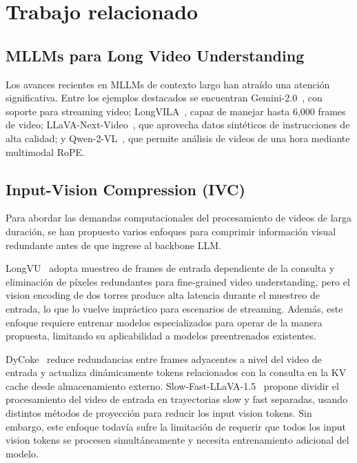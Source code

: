 \section{Trabajo relacionado}\label{sec:related}

\subsection{MLLMs para Long Video Understanding}
Los avances recientes en MLLMs de contexto largo han atraído una atención significativa. Entre los ejemplos destacados se encuentran Gemini-2.0~\cite{google2024cgemini-2.0}, con soporte para streaming video; LongVILA~\cite{Chen2025longvila}, capaz de manejar hasta 6,000 frames de video; LLaVA-Next-Video~\cite{zhang2024llavanext-video}, que aprovecha datos sintéticos de instrucciones de alta calidad; y Qwen-2-VL~\cite{Qwen2VL}, que permite análisis de videos de una hora mediante multimodal RoPE.

\subsection{Input-Vision Compression (IVC)}
Para abordar las demandas computacionales del procesamiento de videos de larga duración, se han propuesto varios enfoques para comprimir información visual redundante antes de que ingrese al backbone LLM. 

LongVU~\cite{shen2024longvu} adopta muestreo de frames de entrada dependiente de la consulta y eliminación de píxeles redundantes para fine-grained video understanding, pero el vision encoding de dos torres produce alta latencia durante el muestreo de entrada, lo que lo vuelve impráctico para escenarios de streaming. Además, este enfoque requiere entrenar modelos especializados para operar de la manera propuesta, limitando su aplicabilidad a modelos preentrenados existentes. 

DyCoke~\cite{tao2024dycokedynamiccompressiontokens} reduce redundancias entre frames adyacentes a nivel del video de entrada y actualiza dinámicamente tokens relacionados con la consulta en la KV cache desde almacenamiento externo. Slow-Fast-LLaVA-1.5~\cite{xu2025slowfastllava15familytokenefficientvideo} propone dividir el procesamiento del video de entrada en trayectorias slow y fast separadas, usando distintos métodos de proyección para reducir los input vision tokens. Sin embargo, este enfoque todavía sufre la limitación de requerir que todos los input vision tokens se procesen simultáneamente y necesita entrenamiento adicional del modelo.

